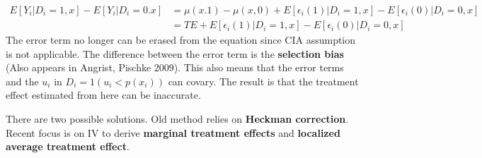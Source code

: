\documentclass[12pt]{article}
\theoremstyle{definition}
\theoremstyle{property}
\theoremstyle{assumption}
\theoremstyle{example}
\theoremstyle{comment}
\begin{document}
\begin{align*}
E[Y_i|D_i=1,x]-E[Y_i|D_i=0.x]&=\mu(x.1)-\mu(x,0)+E[\epsilon_i(1)|D_i=1,x]-E[\epsilon_i(0)|D_i=0,x]\\
&=TE+E[\epsilon_i(1)|D_i=1,x]-E[\epsilon_i(0)|D_i=0,x]
\end{align*}
The error term no longer can be erased from the equation since CIA assumption is not applicable. The difference between the error term is the \textbf{selection bias} (Also appears in Angrist, Pischke 2009). This also means that the error terms and the $u_i$ in $D_i=1(u_i<p(x_i))$ can covary. The result is that the treatment effect estimated from here can be inaccurate. \par
There are two possible solutions. Old method relies on \textbf{Heckman correction}. Recent focus is on IV to derive \textbf{marginal treatment effects} and \textbf{localized average treatment effect}.
\end{document}
